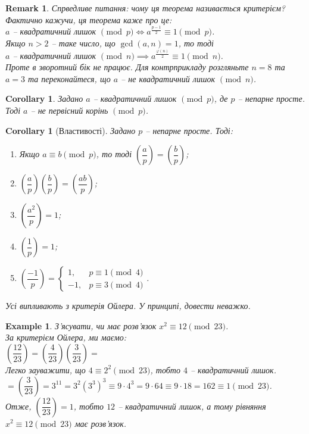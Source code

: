 \documentclass[a4paper, 10pt]{article}
\theoremstyle{theoremdd}
\theoremstyle{theoremdd}
\theoremstyle{theoremdd}
\theoremstyle{theoremdd}
\newtheorem{example}[theorem]{Example}
\theoremstyle{theoremdd}
\theoremstyle{theoremdd}
\newtheorem{remark}[theorem]{Remark}
\theoremstyle{theoremdd}
\theoremstyle{theoremdd}
\newtheorem{corollary}[theorem]{Corollary}
\begin{document}
\begin{remark}
Спрведливе питання: чому ця теорема називається критерієм? Фактично кажучи, ця теорема каже про це:\\
$a$ -- квадратичний лишок $\pmod p \iff a^{\frac{p-1}{2}} \equiv 1 \pmod p$.\\
Якщо $n > 2$ -- таке число, що $\gcd(a,n) = 1$, то тоді\\
$a$ -- квадратичний лишок $\pmod n \implies a^{\frac{\varphi(n)}{2}} \equiv 1 \pmod n$.\\
Проте в зворотний бік не працює. Для контрприкладу розгляньте $n = 8$ та $a = 3$ та переконайтеся, що $a$ -- не квадратичний лишок $\pmod n$.
\end{remark}

\begin{corollary}
Задано $a$ -- квадратичний лишок $\!\! \pmod p$, де $p$ -- непарне просте. Тоді $a$ -- не первісний корінь $\!\! \pmod p$.
\end{corollary}

\begin{corollary}[Властивості]
Задано $p$ -- непарне просте. Тоді:
\begin{enumerate}[nosep,wide=0pt,label={\arabic*)}]
\item Якщо $a \equiv b \pmod p$, то тоді $\left( \dfrac{a}{p} \right) = \left( \dfrac{b}{p} \right)$;
\item $\left( \dfrac{a}{p} \right) \left( \dfrac{b}{p} \right) = \left( \dfrac{ab}{p} \right)$;
\item $\left( \dfrac{a^2}{p} \right) = 1$;
\item $\left( \dfrac{1}{p} \right) = 1$;
\item $\left( \dfrac{-1}{p} \right) = \begin{cases} 1, & p \equiv 1 \pmod 4 \\ -1, & p \equiv 3 \pmod 4 \end{cases}$.
\end{enumerate}
\textit{Усі випливають з критерія Ойлера. У принципі, довести неважко.}
\end{corollary}

\begin{example}
З'ясувати, чи має розв'язок $x^2 \equiv 12 \pmod {23}$.\\
За критерієм Ойлера, ми маємо:\\
$\left( \dfrac{12}{23} \right) = \left( \dfrac{4}{23} \right) \left( \dfrac{3}{23} \right) \boxed{=}$\\
Легко зауважити, що $4 \equiv 2^2 \pmod {23}$, тобто $4$ -- квадратичний лишок.\\
$\boxed{=} \left( \dfrac{3}{23} \right) = 3^{11} = 3^2 (3^3)^3 \equiv 9 \cdot 4^3 = 9 \cdot 64 \equiv 9 \cdot 18 = 162 \equiv 1 \pmod {23}$.\\
Отже, $\left( \dfrac{12}{23} \right) = 1$, тобто $12$ -- квадратичний лишок, а тому рівняння $x^2 \equiv 12 \pmod {23}$ має розв'язок.
\end{example}
\end{document}

